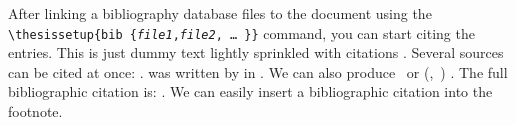 \documentclass[
  digital,     %
  oneside,     %
  nosansbold,  %
  nocolorbold, %
  lof,         %
  lot,         %
]{fithesis4}
\begin{document}
After linking a bibliography data\-base files to the document using
the \verb"\"\texttt{thesis\discretionary{-}{}{}setup\{bib\discretionary{=}{=}{=}%
\{\textit{file1},\textit{file2},\,\ldots\,\}\}} command, you can
start citing the entries. This is just dummy text
\parencite{borgman03} lightly sprinkled with citations
\parencite[p.~123]{greenberg98}. Several sources can be cited at
once: \cite{borgman03,greenberg98,thanh01}.
 was written by \citeauthor{greenberg98} in
\citeyear{greenberg98}. We can also produce \textcite{greenberg98}%
\ or %
\def\citeauthoryear#1{(\textcite{#1},~\citeyear{#1})}%
\citeauthoryear{greenberg98}%
. The full bibliographic citation is:
\emph{}. We can easily insert a bibliographic
citation into the footnote.

\printbibliography[heading=bibintoc]
\end{document}
